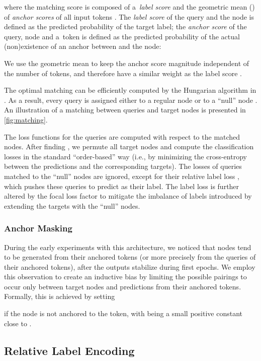 \documentclass[11pt,a4paper]{article}
\begin{document}
where the matching score  is composed of a~\emph{label score} and the geometric mean () of \emph{anchor scores} of all input tokens . The \emph{label score} of the  query and the  node is defined as the predicted probability of the target  label; the \emph{anchor score} of the  query,  node and a~token  is defined as the predicted probability of the actual (non)existence of an anchor between  and the  node:

We use the geometric mean to keep the anchor score  magnitude independent of the number of tokens, and therefore have a similar weight as the label score .


The optimal matching  can be efficiently computed by the Hungarian algorithm \cite{kuhn1955hungarian} in . As a result, every query is assigned either to a regular node or to a ``null'' node .  An illustration of a matching between queries and target nodes is presented in \autoref{fig:matching}.

The loss functions for the queries are computed with respect to the matched nodes. After finding , we permute all target nodes and compute the classification losses in the standard ``order-based'' way (i.e., by minimizing the cross-entropy between the predictions and the corresponding targets). The losses of queries matched to the ``null'' nodes are ignored, except for their relative label loss , which pushes these queries to predict  as their label. The label loss is further altered by the focal loss factor \cite{lin2017focal} to mitigate the imbalance of labels introduced by extending the targets with the ``null'' nodes.

\subsubsection{Anchor Masking}
\label{sec:anchor_masking}
During the early experiments with this architecture, we noticed that nodes tend to be generated from their anchored tokens (or more precisely from the queries of their anchored tokens), after the outputs stabilize during first epochs. We employ this observation to create an inductive bias by limiting the possible pairings to occur only between target nodes and predictions from their anchored tokens. Formally, this is achieved by setting

if the  node is not anchored to the  token, with  being a small positive constant close to . \subsection{Relative Label Encoding}
\label{section:encoding}
\end{document}
